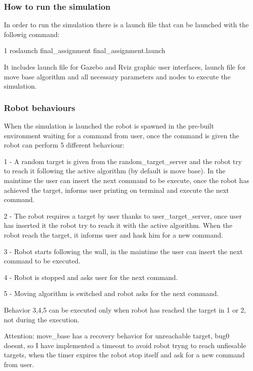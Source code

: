 \subsubsection*{How to run the simulation}

In order to run the simulation there is a launch file that can be launched with the followig command\+:


\begin{DoxyCode}
1 roslaunch final\_assignment final\_assignment.launch 
\end{DoxyCode}


It includes launch file for Gazebo and Rviz graphic user interfaces, launch file for move base algorithm and all necessary parameters and nodes to execute the simulation.

\subsubsection*{Robot behaviours}

When the simulation is launched the robot is spawned in the pre-\/built environment waiting for a command from user, once the command is given the robot can perform 5 different behaviour\+: \begin{DoxyVerb}1 - A random target is given from the random_target_server and the robot try to reach it following the active algorithm (by default is move base).
    In the maintime the user can insert the next command to be execute, once the robot has achieved the target, informs user printing on terminal and execute the next command.

2 - The robot requires a target by user thanks to user_target_server, once user has inserted it the robot try to reach it with the active algorithm.
    When the robot reach the target, it informs user and hask him for a new command.

3 - Robot starts following the wall, in the maintime the user can insert the next command to be executed.

4 - Robot is stopped and asks user for the next command.

5 - Moving algorithm is switched and robot asks for the next command. 
\end{DoxyVerb}


Behavior 3,4,5 can be executed only when robot has reached the target in 1 or 2, not during the execution.

Attention\+: move\+\_\+base has a recovery behavior for unreachable target, bug0 doesn\textquotesingle{}t, so I have implemented a timeout to avoid robot tryng to reach unfiesable targets, when the timer expires the robot stop itself and ask for a new command from user.

